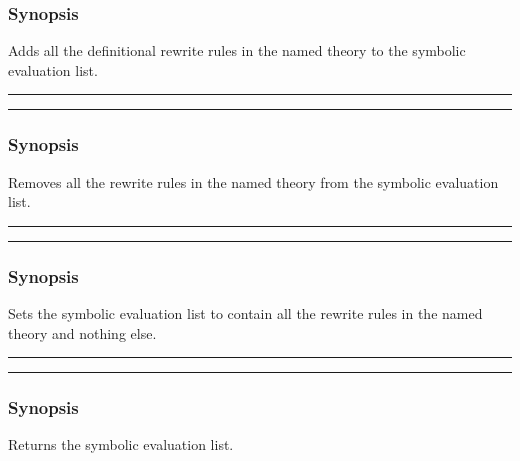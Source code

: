 \subsubsection*{Synopsis}
Adds all the definitional rewrite rules in the named theory to the symbolic
evaluation list.

\vspace{2mm}
\hrule
\vspace{2mm}
\begin{Large}
\end{Large}
\vspace{2mm}
\hrule
\vspace{2mm}


\subsubsection*{Synopsis}
Removes all the rewrite rules in the named theory from the symbolic
evaluation list.
\vspace{2mm}
\hrule
\vspace{2mm}
\begin{Large}
\end{Large}
\vspace{2mm}
\hrule
\vspace{2mm}


\subsubsection*{Synopsis}
Sets the symbolic evaluation list to contain all the rewrite rules in
the named theory and nothing else.

\vspace{2mm}
\hrule
\vspace{2mm}
\begin{Large}
\end{Large}
\vspace{2mm}
\hrule
\vspace{2mm}


\subsubsection*{Synopsis}
Returns the symbolic evaluation list.

